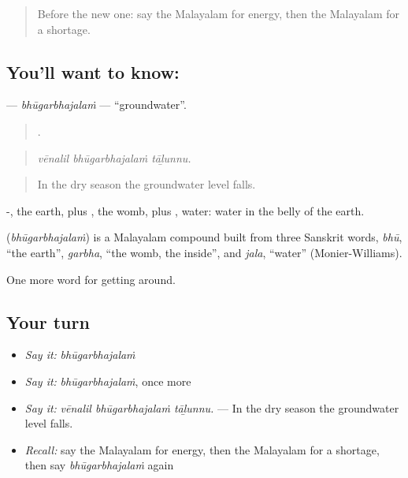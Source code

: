 \label{lesson:ML-C505-bhugarbhajalam}



\begin{quote}
Before the new one: say the Malayalam for energy, then the Malayalam for a shortage.
\end{quote}

\subsection*{You'll want to know: }
\textbf{} — \emph{bhūgarbhajalaṁ} — \textquotedblleft{}groundwater\textquotedblright{}.

\begin{quote}
  .
\end{quote}

\begin{quote}
\emph{vēnalil bhūgarbhajalaṁ tāḻunnu.}
\end{quote}

\begin{quote}
In the dry season the groundwater level falls.
\end{quote}

-, the earth, plus , the womb, plus , water: water in the belly of the earth.

\begin{cousinweb}
\textbf{} (\emph{bhūgarbhajalaṁ}) is a Malayalam compound built from three Sanskrit words, \emph{bhū}, \textquotedblleft{}the earth\textquotedblright{}, \emph{garbha}, \textquotedblleft{}the womb, the inside\textquotedblright{}, and \emph{jala}, \textquotedblleft{}water\textquotedblright{} (Monier-Williams).
\end{cousinweb}

\begin{grammarlens}[title={What you've built}]
One more word for getting around.
\end{grammarlens}

\subsection*{Your turn}
\begin{itemize}
\raggedright
  \item \emph{Say it:} \emph{bhūgarbhajalaṁ}
  \item \emph{Say it:} \emph{bhūgarbhajalaṁ}, once more
  \item \emph{Say it:} \emph{vēnalil bhūgarbhajalaṁ tāḻunnu.} — In the dry season the groundwater level falls.
  \item \emph{Recall:} say the Malayalam for energy, then the Malayalam for a shortage, then say \emph{bhūgarbhajalaṁ} again
\end{itemize}

